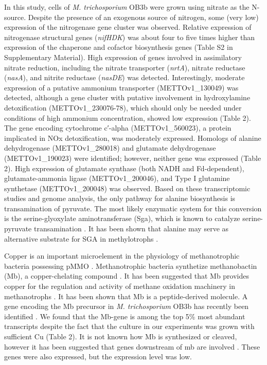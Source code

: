 In this study, cells of \textit{M. trichosporium} OB3b were grown using nitrate as the N-source.
Despite the presence of an exogenous source of nitrogen, some (very low) expression of the nitrogenase gene cluster was observed.
Relative expression of nitrogenase structural genes (\textit{nifHDK}) was about four to five times higher than expression of the chaperone and cofactor biosynthesis genes (Table S2 in Supplementary Material).
High expression of genes involved in assimilatory nitrate reduction, including the nitrate transporter (\textit{nrtA}), nitrate reductase (\textit{nasA}), and nitrite reductase (\textit{nasDE}) was detected.
Interestingly, moderate expression of a putative ammonium transporter (METTOv1\_130049) was detected, although a gene cluster with putative involvement in hydroxylamine detoxification (METTOv1\_230076-78), which should only be needed under conditions of high ammonium concentration, showed low expression (Table 2).
The gene encoding cytochrome c′-alpha (METTOv1\_560023), a protein implicated in NOx detoxification, was moderately expressed.
Homologs of alanine dehydrogenase (METTOv1\_280018) and glutamate dehydrogenase (METTOv1\_190023) were identified; however, neither gene was expressed (Table 2).
High expression of glutamate synthase (both NADH and Fd-dependent), glutamate-ammonia ligase (METTOv1\_200046), and Type I glutamine synthetase (METTOv1\_200048) was observed.
Based on these transcriptomic studies and genome analysis, the only pathway for alanine biosynthesis is transamination of pyruvate.
The most likely enzymatic system for this conversion is the serine-glyoxylate aminotransferase (Sga), which is known to catalyze serine-pyruvate transamination \cite{liepman2001}.
It has been shown that alanine may serve as alternative substrate for SGA in methylotrophs \cite{karsten2001}.

Copper is an important microelement in the physiology of methanotrophic bacteria possessing pMMO \cite{anthony1982}.
Methanotrophic bacteria synthetize methanobactin (Mb), a copper-chelating compound \cite{kim2004, balasubramanian2008, semrau2010}.
It has been suggested that Mb provides copper for the regulation and activity of methane oxidation machinery in methanotrophs \cite{balasubramanian2010, semrau2010}.
It has been shown that Mb is a peptide-derived molecule.
A gene encoding the Mb precursor in \textit{M. trichosporium} OB3b has recently been identified \cite{krentz2010}.
We found that the Mb-gene is among the top 5\% most abundant transcripts despite the fact that the culture in our experiments was grown with sufficient Cu (Table 2).
It is not known how Mb is synthesized or cleaved, however it has been suggested that genes downstream of mb are involved \cite{krentz2010}.
These genes were also expressed, but the expression level was low.

